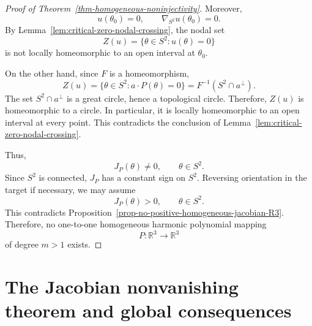\documentclass[10pt]{amsart}
\numberwithin{equation}{section}
\theoremstyle{definition}
\newcommand{\R}{\mathbb R}
\begin{document}
\begin{proof}[Proof of Theorem~\ref{thm-homogeneous-noninjectivity}]
Moreover,
\[
        u(\theta_0)=0,
        \qquad
        \nabla_{S^2}u(\theta_0)=0.
\]
By Lemma~\ref{lem:critical-zero-nodal-crossing}, the nodal set
\[
        Z(u)=\{\theta\in S^2:u(\theta)=0\}
\]
is not locally homeomorphic to an open interval at \(\theta_0\).

On the other hand, since \(F\) is a homeomorphism,
\[
        Z(u)
        =
        \{\theta\in S^2:a\cdot P(\theta)=0\}
        =
        F^{-1}(S^2\cap a^\perp).
\]
The set \(S^2\cap a^\perp\) is a great circle, hence a topological circle.
Therefore, \(Z(u)\) is homeomorphic to a circle. In particular, it is locally
homeomorphic to an open interval at every point. This contradicts the
conclusion of Lemma~\ref{lem:critical-zero-nodal-crossing}.

Thus,
\[
        J_P(\theta)\neq0,
        \qquad
        \theta\in S^2.
\]
Since \(S^2\) is connected, \(J_P\) has a constant sign on \(S^2\). Reversing
orientation in the target if necessary, we may assume
\[
        J_P(\theta)>0,
        \qquad
        \theta\in S^2.
\]
This contradicts Proposition~\ref{prop-no-positive-homogeneous-jacobian-R3}.
Therefore, no one-to-one homogeneous harmonic polynomial mapping
\[
        P:\R^3\to\R^3
\]
of degree \(m>1\) exists.
\end{proof}

\section{The Jacobian nonvanishing theorem and global consequences}
\label{sec-lewy}
\end{document}
